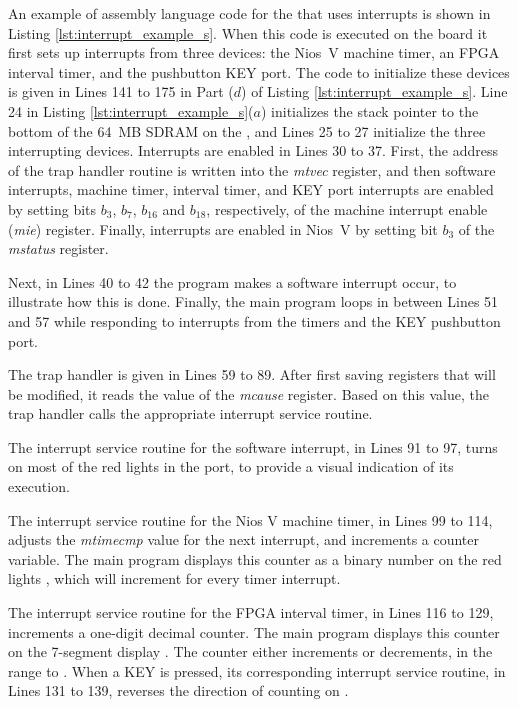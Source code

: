 An example of assembly language code for the {\it \systemNameFull} that uses interrupts is
shown in Listing \ref{lst:interrupt_example_s}. When this code is executed on the
{\DEBoard} board it first sets up interrupts from three devices: the Nios~V machine timer, 
an FPGA interval timer, and the pushbutton KEY port. The code to initialize these devices
is given in Lines 141 to 175 in Part ($d$) of Listing \ref{lst:interrupt_example_s}. 
Line 24 in Listing \ref{lst:interrupt_example_s}($a$) initializes the stack pointer to
the bottom of the 64~MB SDRAM on the {\DEBoard}, and Lines 25 to 27 initialize the
three interrupting devices. Interrupts are enabled in Lines 30 to 37. First, the address of
the trap handler routine is written into the {\it mtvec} register, and then software
interrupts, machine timer, interval timer, and KEY port interrupts are
enabled by setting bits $b_3$, $b_7$, $b_{16}$ and $b_{18}$, respectively, of the 
machine interrupt enable ({\it mie}) register. 
Finally, interrupts are enabled in Nios~V by setting bit $b_3$ of the {\it mstatus} register.

Next, in Lines 40 to 42 the program makes a software 
interrupt occur, to illustrate how this is done. Finally, the main program loops in
between Lines 51 and 57 while responding to interrupts from the timers and the 
KEY pushbutton port. 

The trap handler is given in Lines 59 to 89. After first saving registers that will be
modified, it reads the value of the {\it mcause} register. Based on this value, the trap
handler calls the appropriate interrupt service routine. 

The interrupt service routine for the software interrupt, in Lines 91 to 97, 
turns on most of the red lights in the  port, to provide a visual indication of 
its execution. 

The interrupt service routine for the Nios V machine timer, in Lines 99 to 114,
adjusts the {\it mtimecmp} value for the next interrupt, and 
increments a counter variable. The main program displays this counter as a binary number 
on the red lights , which will increment for every timer interrupt.

The interrupt service routine for the FPGA interval timer, in Lines 116 to 129,
increments a one-digit decimal counter. The main program displays this counter on the 
7-segment display . The counter either increments or decrements,
in the range  to .  When a KEY is pressed, its corresponding 
interrupt service routine, in Lines 131 to 139, reverses the direction of counting on . 


